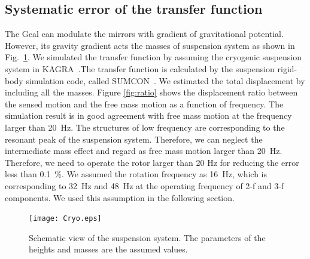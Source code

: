 \documentclass[A4]{spie}  %
\begin{document}
\subsection{Systematic error of the transfer function}
The Gcal can modulate the mirrors with gradient of gravitational potential. However, its gravity gradient acts the masses of suspension system as shown in Fig.~\ref{fig:cryo}. We simulated the transfer function by assuming the cryogenic suspension system in KAGRA~\cite{0264-9381-34-22-225001}.The transfer function is calculated by the suspension rigid-body simulation code, called SUMCON~\cite{SUMCON}. We estimated the total displacement by including all the masses. Figure \ref{fig:ratio} shows the displacement ratio between the sensed motion and the free mass motion as a function of frequency. The simulation result is in good agreement with free mass motion at the frequency larger than 20~Hz. The structures of low frequency are corresponding to the resonant peak of the suspension system. Therefore, we can neglect the intermediate mass effect and regard as free mass motion larger than 20~Hz. 
Therefore, we need to operate the rotor larger than 20 Hz for reducing the error less than 0.1~\%.
We assumed the rotation frequency as 16~Hz, which is corresponding to 32~Hz and 48~Hz at the operating frequency of 2-f and 3-f components.  We used this assumption in the following section.


\begin{figure}
\begin{center}
\texttt{[image: Cryo.eps]}
\caption{Schematic view of the suspension system. The parameters of the heights and masses are the assumed values. }
\label{fig:cryo}
\end{center}
\end{figure}
\end{document}
